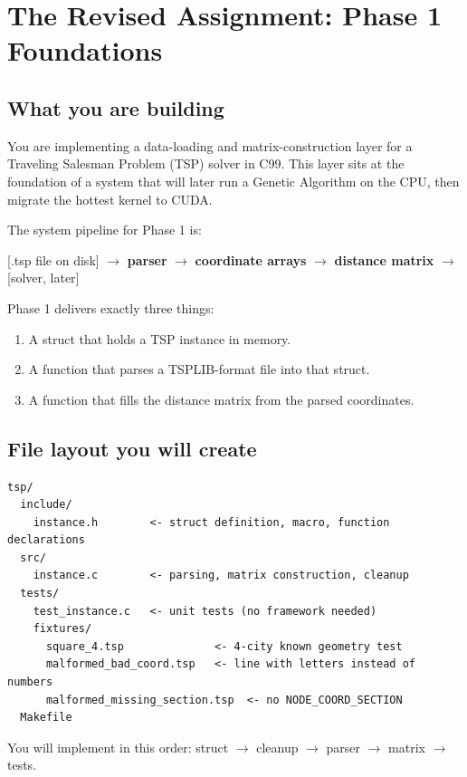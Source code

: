 \section{The Revised Assignment: Phase 1 Foundations}

\subsection{What you are building}

You are implementing a data-loading and matrix-construction layer for a Traveling Salesman Problem (TSP) solver in C99. This layer sits at the foundation of a system that will later run a Genetic Algorithm on the CPU, then migrate the hottest kernel to CUDA.

The system pipeline for Phase 1 is:

\begin{center}
\ttfamily
\small
[.tsp file on disk] $\longrightarrow$ \textbf{parser} $\longrightarrow$ \textbf{coordinate arrays} $\longrightarrow$ \textbf{distance matrix} $\longrightarrow$ [solver, later]
\end{center}

\medskip

Phase 1 delivers exactly three things:
\begin{enumerate}[label=\arabic*.]
  \item A struct that holds a TSP instance in memory.
  \item A function that parses a TSPLIB-format file into that struct.
  \item A function that fills the distance matrix from the parsed coordinates.
\end{enumerate}

\subsection{File layout you will create}

\begin{lstlisting}[style=cstyle, language={}]
tsp/
  include/
    instance.h        <- struct definition, macro, function declarations
  src/
    instance.c        <- parsing, matrix construction, cleanup
  tests/
    test_instance.c   <- unit tests (no framework needed)
    fixtures/
      square_4.tsp              <- 4-city known geometry test
      malformed_bad_coord.tsp   <- line with letters instead of numbers
      malformed_missing_section.tsp  <- no NODE_COORD_SECTION
  Makefile
\end{lstlisting}

You will implement in this order: struct $\to$ cleanup $\to$ parser $\to$ matrix $\to$ tests.

\newpage
